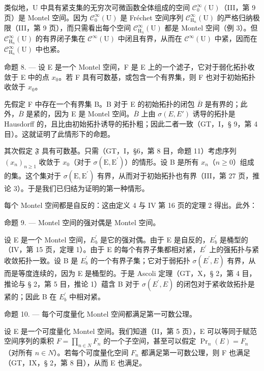 类似地，U 中具有紧支集的无穷次可微函数全体组成的空间 \(\mathcal{C}_0^\infty (\mathrm{U})\)（III，第 9 页）是 Montel 空间。因为 \(\mathcal{C}_0^\infty (\mathrm{U})\) 是 Fréchet 空间序列 \(\mathcal{C}_{\mathrm{H}_n}^\infty (\mathrm{U})\) 的严格归纳极限（III，第 9 页），而只需看出每个空间 \(\mathcal{C}_{\mathrm{H}_n}^\infty (\mathrm{U})\) 都是 Montel 空间（例 3）。但 \(\mathcal{C}_{\mathrm{H}_n}^\infty (\mathrm{U})\) 的有界闭子集在 \(\mathcal{C}^{\infty}(\mathrm{U})\) 中闭且有界，从而在 \(\mathcal{C}^{\infty}(\mathrm{U})\) 中紧，因而在 \(\mathcal{C}_{\mathrm{H}_n}^\infty (\mathrm{U})\) 中也紧。

命题 8. --- 设 E 是一个 Montel 空间，F 是 E 上的一个滤子，它对于弱化拓扑收敛于 E 中的点 \(x_{0}\)。若 F 具有可数基，或包含一个有界集，则 F 也对于初始拓扑收敛于 \(x_{0}\)。

先假定 F 中存在一个有界集 B。B 对于 E 的初始拓扑的闭包 \(\overline{B}\) 是有界的；此外，\(\overline{B}\) 是紧的，因为 E 是 Montel 空间。\(\overline{B}\) 上由 \(\sigma(E, E')\) 诱导的拓扑是 Hausdorff 的，且比由初始拓扑诱导的拓扑粗；因此二者一致（GT，I，§ 9，第 4 目）。这就证明了此情形下的命题。

其次假定 \(\mathfrak{F}\) 具有可数基。只需（GT，I，§6，第 8 目，命题 11）考虑序列 \((x_{n})_{n\geqslant 1}\) 收敛于 \(x_0\)（对于 \(\sigma (\mathrm{E},\mathrm{E}^{\prime})\)）的情形。设 B 是所有 \(x_{n}\)（\(n\geqslant 0\)）组成的集。这个集对于 \(\sigma (\mathrm{E},\mathrm{E}^{\prime})\) 有界，从而对于初始拓扑也有界（III，第 27 页，推论 3）。于是我们已归结为证明的第一种情形。

每个 Montel 空间都是自反的：这由定义 4 与 IV 第 16 页的定理 2 得出。此外：

命题 9. --- Montel 空间的强对偶是 Montel 空间。

设 E 是一个 Montel 空间，\(E_{b}^{\prime}\) 是它的强对偶。由于 E 是自反的，\(E_{b}^{\prime}\) 是桶型的（IV，第 15 页，定理 1）。由于 E 的每个有界子集都相对紧，\(E^{\prime}\) 上的强拓扑与紧收敛拓扑一致。设 B 是 \(E_{b}^{\prime}\) 的一个有界子集；它对于弱拓扑 \(\sigma(E^{\prime}, E)\) 有界，从而是等度连续的，因为 E 是桶型的。于是 Ascoli 定理（GT，X，§ 2，第 4 目，推论与 § 2，第 5 目，推论 1）蕴含 B 对于 \(\sigma(E^{\prime}, E)\) 的闭包对于紧收敛拓扑是紧的；因此 B 在 \(E_{b}^{\prime}\) 中相对紧。

命题 10. --- 每个可度量化 Montel 空间都满足第一可数公理。

设 E 是一个可度量化 Montel 空间。我们知道（II，第 5 页），E 可以等同于赋范空间序列的乘积 \(F = \prod_{n \in N} F_n\) 的一个子空间，甚至可以假定 \(\Pr_n(E) = F_n\)（对所有 \(n \in N\)）。若每个可度量化空间 \(F_n\) 都满足第一可数公理，则 F 也满足（GT，IX，§ 2，第 8 目），从而 E 也满足。

